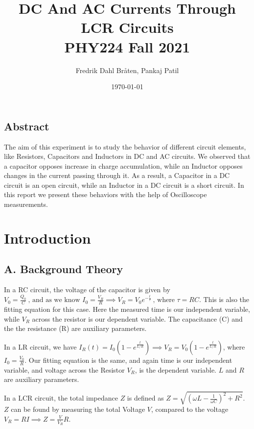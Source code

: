 \documentclass[a4paper,12pt]{article}
\begin{document}
\title{DC And AC Currents Through LCR Circuits \\
\large PHY224 Fall 2021}
\author{Fredrik Dahl Bråten, Pankaj Patil}
\date{\today}
\maketitle
\begin{center}
	\section*{Abstract}
\end{center}
The aim of this experiment is  to study the behavior of different circuit elements, like 
Resistors, Capacitors and Inductors in DC and AC circuits. We observed that a capacitor opposes
increase in charge accumulation, while an Inductor opposes changes in the current passing through it. As a result, a Capacitor in a DC circuit is an open
circuit, while an Inductor in a DC circuit is a short circuit. In this report we present 
these behaviors with the help of Oscilloscope measurements.

\section{Introduction}

\subsection*{A. Background Theory}
In a RC circuit, the voltage of the capacitor is given by $V_0 = \frac{Q_0}{C} \ \text{, and as we know  } I_0 = \frac{V_R}{R} \implies V_R = V_0e^{-\frac{t}{\tau}}\ \text{, where } \tau = RC$. This is also 
the fitting equation for this case. Here the measured time is our independent variable, while $V_R$ across the resistor is our dependent variable. The capacitance (C) and the the resistance (R) are 
auxiliary parameters.

In a LR circuit, we have $I_R(t) = I_0(1-e^{\frac{t}{L/R}}) \implies V_R =  V_0(1-e^{\frac{t}{L/R}})$, where $I_0  = \frac{V_0}{R}$. Our fitting equation is the same, and again time is our 
independent variable, and voltage across the Resistor $V_R$, is the dependent variable. $L$ and $R$ are auxiliary parameters.

In a LCR circuit, the total impedance $Z$ is defined as $Z = \sqrt{(\omega L - \frac{1}{\omega C})^2 + R^2}$. $Z$ can be found by measuring 
the total Voltage $V$, compared to the voltage $V_R = RI \implies Z = \frac{V}{V_R}R$.
\end{document}
